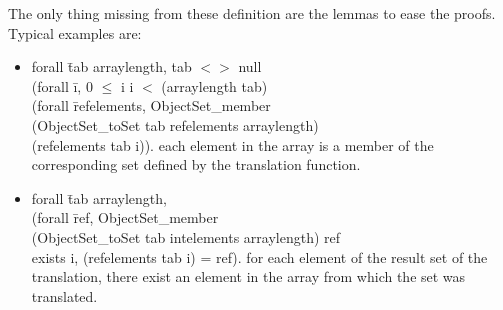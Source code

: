 The only thing missing from these definition are the lemmas to ease the proofs. 
Typical examples are: 
\begin{itemize}
\item
\btab
forall \=tab arraylength,
tab $<>$ null \rarrow \+\\
(forall \=i, 0 $\le$ i \conj i $<$ (arraylength tab) \rarrow \+\\
(forall \=refelements, ObjectSet\_member  \+\\
(ObjectSet\_toSet tab refelements arraylength) \\
(refelements tab i)). 
\etab
each element in the array  is a member of the corresponding set defined by the translation
function.
\item
\btab
forall \=tab arraylength,\+\\
(forall \=ref,  ObjectSet\_member \+\\(ObjectSet\_toSet tab intelements arraylength)  ref
\rarrow \\
exists i, (refelements tab i) = ref). 
\etab
for each element of the result set of the translation, there exist an element in the 
array from which the set was translated.
\end{itemize}